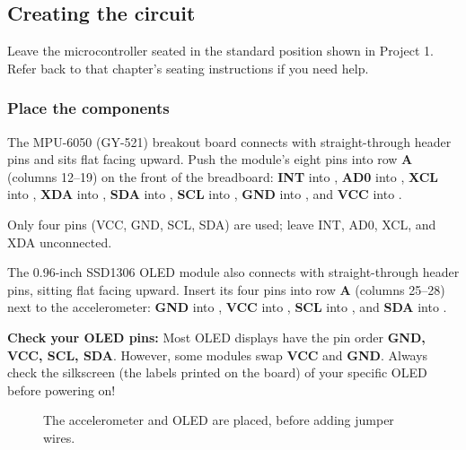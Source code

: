 \subsection{Creating the circuit}

Leave the microcontroller seated in the standard position shown in Project 1. Refer back to
that chapter's seating instructions if you need help.

\subsubsection{Place the components}
The MPU-6050 (GY-521) breakout board connects with straight-through header pins and sits flat facing upward.
Push the module's eight pins into row \textbf{A} (columns 12--19) on the front of the breadboard:
\textbf{INT} into ,
\textbf{AD0} into ,
\textbf{XCL} into ,
\textbf{XDA} into ,
\textbf{SDA} into ,
\textbf{SCL} into ,
\textbf{GND} into , and
\textbf{VCC} into .

Only four pins (VCC, GND, SCL, SDA) are used; leave INT, AD0, XCL, and XDA unconnected.

The 0.96-inch SSD1306 OLED module also connects with straight-through header pins, sitting flat facing upward.
Insert its four pins into row \textbf{A} (columns 25--28) next to the accelerometer:
\textbf{GND} into ,
\textbf{VCC} into ,
\textbf{SCL} into , and
\textbf{SDA} into .

\begin{tcolorbox}[colback=yellow!10!white,colframe=yellow!50!black]
    \textbf{Check your OLED pins:} Most OLED displays have the pin order \textbf{GND, VCC, SCL, SDA}.
    However, some modules swap \textbf{VCC} and \textbf{GND}. Always check the silkscreen (the labels printed on
    the board) of your specific OLED before powering on!
\end{tcolorbox}

\begin{figure}[H]
    \centering
    \caption{The accelerometer and OLED are placed, before adding jumper wires.}
\end{figure}

